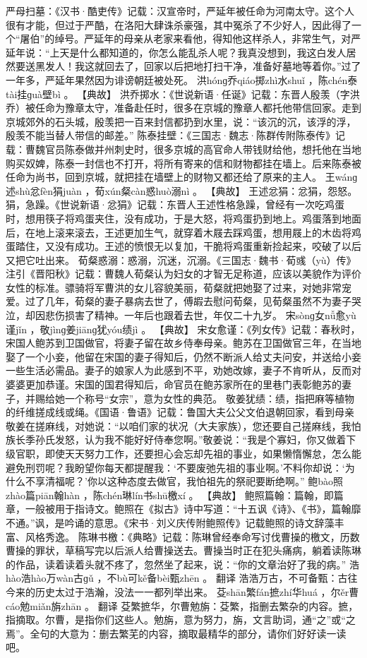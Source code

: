\documentclass[12pt,UTF8]{ctexbook}
\begin{document}
严母扫墓：《汉书·酷吏传》记载：汉宣帝时，严延年被任命为河南太守。这个人很有才能，但过于严酷，在洛阳大肆诛杀豪强，其中冤杀了不少好人，因此得了一个“屠伯”的绰号。严延年的母亲从老家来看他，得知他这样杀人，非常生气，对严延年说：“上天是什么都知道的，你怎么能乱杀人呢？我真没想到，我这白发人居然要送黑发人！我这就回去了，回家以后把地打扫干净，准备好墓地等着你。”过了一年多，严延年果然因为诽谤朝廷被处死。
洪hónɡ乔qiáo掷zhì水shuǐ
，陈chén泰tài挂ɡuà壁bì
。
【典故】
洪乔掷水：《世说新语·任诞》记载：东晋人殷羡（字洪乔）被任命为豫章太守，准备赴任时，很多在京城的豫章人都托他带信回家。走到京城郊外的石头城，殷羡把一百来封信都扔到水里，说：“该沉的沉，该浮的浮，殷羡不能当替人带信的邮差。”
陈泰挂壁：《三国志·魏志·陈群传附陈泰传》记载：曹魏官员陈泰做并州刺史时，很多京城的高官命人带钱财给他，想托他在当地购买奴婢，陈泰一封信也不打开，将所有寄来的信和财物都挂在墙上。后来陈泰被任命为尚书，回到京城，就把挂在墙壁上的财物又都还给了原来的主人。
王wánɡ述shù忿fèn狷juàn
，荀xún粲càn惑huò溺nì
。
【典故】
王述忿狷：忿狷，怨怒。狷，急躁。《世说新语·忿狷》记载：东晋人王述性格急躁，曾经有一次吃鸡蛋时，想用筷子将鸡蛋夹住，没有成功，于是大怒，将鸡蛋扔到地上。鸡蛋落到地面后，在地上滚来滚去，王述更加生气，就穿着木屐去踩鸡蛋，想用屐上的木齿将鸡蛋踏住，又没有成功。王述的愤恨无以复加，干脆将鸡蛋重新捡起来，咬破了以后又把它吐出来。
荀粲惑溺：惑溺，沉迷，沉溺。《三国志·魏书·荀彧（yù）传》注引《晋阳秋》记载：曹魏人荀粲认为妇女的才智无足称道，应该以美貌作为评价女性的标准。骠骑将军曹洪的女儿容貌美丽，荀粲就把她娶了过来，对她非常宠爱。过了几年，荀粲的妻子暴病去世了，傅嘏去慰问荀粲，见荀粲虽然不为妻子哭泣，却因悲伤损害了精神。一年后也跟着去世，年仅二十九岁。
宋sònɡ女nǚ愈yù谨jǐn
，敬jìnɡ姜jiānɡ犹yóu绩jì
。
【典故】
宋女愈谨：《列女传》记载：春秋时，宋国人鲍苏到卫国做官，将妻子留在故乡侍奉母亲。鲍苏在卫国做官三年，在当地娶了一个小妾，他留在宋国的妻子得知后，仍然不断派人给丈夫问安，并送给小妾一些生活必需品。妻子的娘家人为此感到不平，劝她改嫁，妻子不肯听从，反而对婆婆更加恭谨。宋国的国君得知后，命官员在鲍苏家所在的里巷门表彰鲍苏的妻子，并赐给她一个称号“女宗”，意为女性的典范。
敬姜犹绩：绩，指把麻等植物的纤维搓成线或绳。《国语·鲁语》记载：鲁国大夫公父文伯退朝回家，看到母亲敬姜在搓麻线，对她说：“以咱们家的状况（大夫家族），您还要自己搓麻线，我怕族长季孙氏发怒，认为我不能好好侍奉您啊。”敬姜说：“我是个寡妇，你又做着下级官职，即使天天努力工作，还要担心会忘却先祖的事业，如果懒惰懈怠，怎么能避免刑罚呢？我盼望你每天都提醒我：‘不要废弛先祖的事业啊。’不料你却说：‘为什么不享清福呢？’你以这种态度去做官，我怕祖先的祭祀要断绝啊。”
鲍bào照zhào篇piān翰hàn
，陈chén琳lín书shū檄xí
。
【典故】
鲍照篇翰：篇翰，即篇章，一般被用于指诗文。鲍照在《拟古》诗中写道：“十五讽《诗》、《书》，篇翰靡不通。”讽，是吟诵的意思。《宋书·刘义庆传附鲍照传》记载鲍照的诗文辞藻丰富、风格秀逸。
陈琳书檄：《典略》记载：陈琳曾经奉命写讨伐曹操的檄文，历数曹操的罪状，草稿写完以后派人给曹操送去。曹操当时正在犯头痛病，躺着读陈琳的作品，读着读着头就不疼了，忽然坐了起来，说：“你的文章治好了我的病。”
浩hào浩hào万wàn古ɡǔ
，不bù可kě备bèi甄zhēn
。
翻译
浩浩万古，不可备甄：古往今来的历史太过于浩瀚，没法一一都列举出来。
芟shān繁fán摭zhí华huá
，尔ěr曹cáo勉miǎn旃zhān
。
翻译
芟繁摭华，尔曹勉旃：芟繁，指删去繁杂的内容。摭，指摘取。尔曹，是指你们这些人。勉旃，意为努力，旃，文言助词，通“之”或“之焉”。全句的大意为：删去繁芜的内容，摘取最精华的部分，请你们好好读一读吧。

\backmatter
\end{document}
